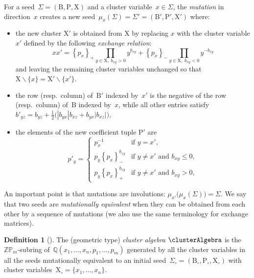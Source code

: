 \documentclass{amsart}
\theoremstyle{definition}
\newtheorem{definition}[theorem]{Definition}
\newcommand{\Q}{\mathbb{Q}} %
\newcommand{\Z}{\mathbb{Z}} %
\newcommand{\ssm}{\smallsetminus} %
\newcommand{\darkblue}{\color{darkblue}} %
\newcommand{\defn}[1]{\textsl{\darkblue #1}} %
\newcommand{\Trop}[1]{\mathbb{P}_{#1}} %
\newcommand{\positiveExponents}[1]{\left\{#1\right\}_+} %
\newcommand{\negativeExponents}[1]{\left\{#1\right\}_-} %
\newcommand{\seed}{\Sigma} %
\newcommand{\cluster}{\mathrm{X}} %
\newcommand{\coefficients}{\mathrm{P}} %
\newcommand{\B}{\mathrm{B}} %
\begin{document}
For a seed~$\seed = (\B, \coefficients, \cluster)$ and a cluster variable~$x \in \seed$, the \defn{mutation} in direction~$x$ creates a new seed~$\mu_x(\seed) = \seed' = (\B', \coefficients', \cluster')$ where:
\begin{itemize}
\item the new cluster $\cluster'$ is obtained from $\cluster$ by replacing $x$ with the cluster variable $x'$ defined by the following \defn{exchange relation}:
\[
x x' = \positiveExponents{p_x} \prod_{{y \in \cluster, \; b_{xy}  > 0}} y^{b_{xy}} + \negativeExponents{p_x} \prod_{{y \in \cluster, \; b_{xy}  <0}} y^{-b_{xy}}
\]
and leaving the remaining cluster variables unchanged so that $\cluster \ssm \{x\} = \cluster' \ssm \{x'\}$.

\item the row (resp.~column) of~$\B'$ indexed by~$x'$ is the negative of the row (resp.~column) of~$\B$ indexed by~$x$, while all other entries satisfy
\(
b'_{yz} = b_{yz} + \frac{1}{2}\big(|b_{yx}| b_{xz} + b_{yx}|b_{xz}|\big),
\)

\item the elements of the new coefficient tuple $\coefficients'$ are 
\[
p'_y =
\begin{cases}
	p_x^{-1}  & \text{if } y = x', \\
	p_y\negativeExponents{p_x}^{b_{xy}}  & \text{if } y \neq x' \text{ and } b_{xy} \leq 0, \\
	p_y\positiveExponents{p_x}^{b_{xy}}  & \text{if } y \neq x' \text{ and } b_{xy} > 0,
\end{cases}
\]
\end{itemize}
An important point is that mutations are involutions: $\mu_{x'} \big( \mu_{x}(\seed) \big) = \seed$.
We say that two seeds are \defn{mutationally equivalent} when they can be obtained from each other by a sequence of mutations (we also use the same terminology for exchange matrices).

\begin{definition}[{\cite[Definition~2.11]{FominZelevinsky-ClusterAlgebrasIV}}]
The (geometric type) \defn{cluster algebra} $\clusterAlgebra$ is the $\Z\Trop{m}$-subring of~$\Q(x_1, \dots, x_n, p_1, \dots, p_m)$ generated by all the cluster variables in all the seeds mutationally equivalent to an initial seed~$\seed_\circ = (\B_\circ, \coefficients_\circ, \cluster_\circ)$ with cluster variables~$\cluster_\circ = \{x_1, \dots, x_n\}$.
\end{definition}
\end{document}
